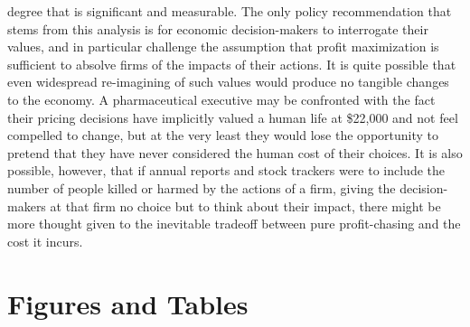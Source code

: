 \documentclass[12pt,english]{article} \usepackage{mathptmx}
\begin{document}
degree that is significant and measurable. The only policy 
recommendation that stems from this analysis is for economic 
decision-makers to interrogate their values, and in particular challenge 
the assumption that profit maximization is sufficient to absolve firms 
of the impacts of their actions. It is quite possible that even 
widespread re-imagining of such values would produce no tangible changes 
to the economy. A pharmaceutical executive may be confronted with the 
fact their pricing decisions have implicitly valued a human life at 
\$22,000 and not feel compelled to change, but at the very least they 
would lose the opportunity to pretend that they have never considered 
the human cost of their choices. It is also possible, however, that if 
annual reports and stock trackers were to include the number of people 
killed or harmed by the actions of a firm, giving the decision-makers at 
that firm no choice but to think about their impact, there might be more 
thought given to the inevitable tradeoff between pure profit-chasing and 
the cost it incurs. \vfill \pagebreak{}  
 \vfill \pagebreak{} 
\clearpage \section*{Figures and Tables} \begin{table}[htp] 
\caption{Drug and Disease Info} \label{Table 1 } \end{table} 
\end{document}
